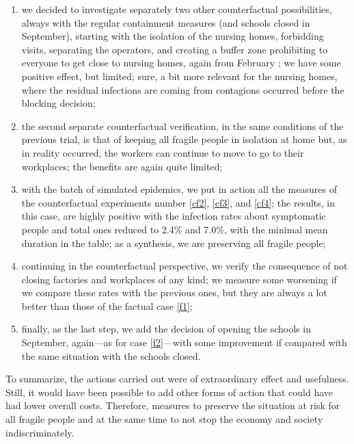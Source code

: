 \documentclass[graybox]{svmult}
\begin{document}
\begin{enumerate}
\item\label{cf3} we decided to investigate separately two other counterfactual possibilities, always with the regular containment measures (and schools closed in September), starting with the isolation of the nursing homes, forbidding visits, separating the operators, and creating a buffer zone prohibiting to everyone to get close to nursing homes, again from February ; we have some positive effect, but limited; sure, a bit more relevant for the nursing homes, where the residual infections are coming from contagions occurred before the blocking decision;


\item\label{cf4} the second separate counterfactual verification, in the same conditions of the previous trial, is that of keeping all fragile people in isolation at home but, as in reality occurred, the workers can continue to move to go to their workplaces; the benefits are again quite limited;

\item\label{cf5} with the  batch of simulated epidemics, we put in action all the measures of the counterfactual experiments number \ref{cf2}, \ref{cf3}, and \ref{cf4}; the results, in this case, are highly positive with the infection rates about symptomatic people and total ones reduced to 2.4\% and 7.0\%, with the minimal mean duration in the table; as a synthesis, we are preserving all fragile people;

\item\label{cf6} continuing in the counterfactual perspective, we verify the consequence of not closing factories and workplaces of any kind; we measure some worsening if we compare these rates with the previous ones, but they are always a lot better than those of the factual case \ref{f1};

\item\label{cf7} finally, as the last step, we add the decision of opening the schools in September, again---as for case \ref{f2}---with some improvement if compared with the same situation with the schools closed.

\end{enumerate}

To summarize, the actions carried out were of extraordinary effect and usefulness. Still, it would have been possible to add other forms of action that could have had lower overall costs. Therefore, measures to preserve the situation at risk for all fragile people and at the same time to not stop the economy and society indiscriminately.
\end{document}
